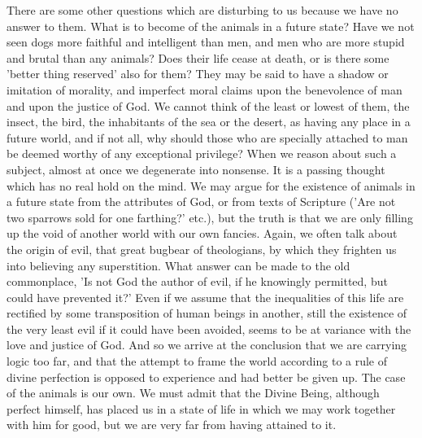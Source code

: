 There are some other questions which are disturbing to us because we
have no answer to them. What is to become of the animals in a future
state? Have we not seen dogs more faithful and intelligent than men,
and men who are more stupid and brutal than any animals? Does their life
cease at death, or is there some 'better thing reserved' also for
them? They may be said to have a shadow or imitation of morality, and
imperfect moral claims upon the benevolence of man and upon the justice
of God. We cannot think of the least or lowest of them, the insect, the
bird, the inhabitants of the sea or the desert, as having any place in
a future world, and if not all, why should those who are specially
attached to man be deemed worthy of any exceptional privilege? When we
reason about such a subject, almost at once we degenerate into nonsense.
It is a passing thought which has no real hold on the mind. We may argue
for the existence of animals in a future state from the attributes of
God, or from texts of Scripture ('Are not two sparrows sold for one
farthing?' etc.), but the truth is that we are only filling up the void
of another world with our own fancies. Again, we often talk about
the origin of evil, that great bugbear of theologians, by which they
frighten us into believing any superstition. What answer can be made
to the old commonplace, 'Is not God the author of evil, if he knowingly
permitted, but could have prevented it?' Even if we assume that the
inequalities of this life are rectified by some transposition of human
beings in another, still the existence of the very least evil if it
could have been avoided, seems to be at variance with the love and
justice of God. And so we arrive at the conclusion that we are carrying
logic too far, and that the attempt to frame the world according to a
rule of divine perfection is opposed to experience and had better be
given up. The case of the animals is our own. We must admit that the
Divine Being, although perfect himself, has placed us in a state of life
in which we may work together with him for good, but we are very far
from having attained to it.

